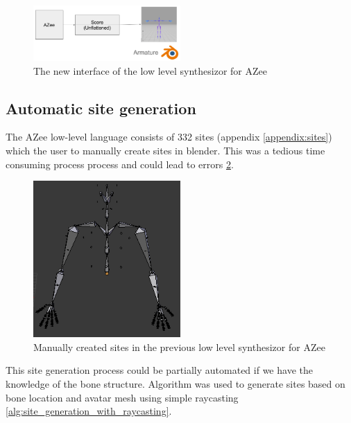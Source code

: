 \documentclass[../../main.tex]{subfiles}
\begin{document}
\begin{figure}
    \centering
    \includegraphics[width=0.5\textwidth]{chapters/rigging_layers/images/new_interface.png}
    \caption{The new interface of the low level synthesizor for AZee}
    \label{fig:new_interface}
\end{figure}

\subsection{Automatic site generation}
\label{ch:rigging_layers:proc_rig_signing_avatars:auto_site_generation}

The AZee low-level language consists of 332 sites (appendix \ref{appendix:sites}) which the user to manually create sites in blender. This was a tedious time consuming process process and could lead to errors \ref{fig:prev_sites}.

\begin{figure}
    \centering
    \includegraphics[width=0.5\textwidth]{chapters/rigging_layers/images/prev_sites.png}
    \caption{Manually created sites in the previous low level synthesizor for AZee}
    \label{fig:prev_sites}
\end{figure}

This site generation process could be partially automated if we have the knowledge of the bone structure. Algorithm was used to generate sites based on bone location and avatar mesh using simple raycasting \ref{alg:site_generation_with_raycasting}.
\end{document}
